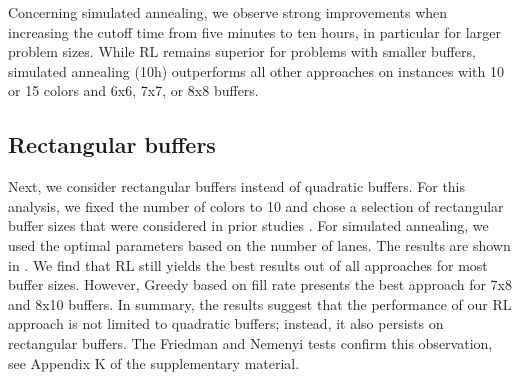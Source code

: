 \documentclass[11pt]{elsarticle}
\newcommand{\blackversion}{ }
\newcommand{\blackorcolor}{
\ifdefined\blackversion
	\color{black}
\fi
}
\newcommand{\REV}[1]{{\color{myblue}\blackorcolor #1}}
\begin{document}
Concerning simulated annealing, we observe strong improvements when increasing the cutoff time from five minutes to ten hours, in particular for larger problem sizes. While RL remains superior for problems with smaller buffers, simulated annealing (10h) outperforms all other approaches on instances with 10 or 15 colors and 6x6, 7x7, or 8x8 buffers.

\subsection{Rectangular buffers}

Next, we consider rectangular buffers instead of quadratic buffers. For this analysis, we fixed the number of colors to 10 and chose a selection of rectangular buffer sizes that were considered in prior studies  \citep{Huang.2024,Lin.2011,spieckermann_sequential_2004,sun2017study}. For simulated annealing, we used the optimal parameters based on the number of lanes. The results are shown in .
We find that RL still yields the best results out of all approaches for most buffer sizes. However, Greedy based on fill rate presents the best approach for 7x8 and 8x10 buffers.
In summary, the results suggest that the performance of our RL approach is not limited to quadratic buffers; instead, it also persists on rectangular buffers. \REV{The Friedman and Nemenyi tests confirm this observation, see Appendix K of the supplementary material.}
\end{document}
